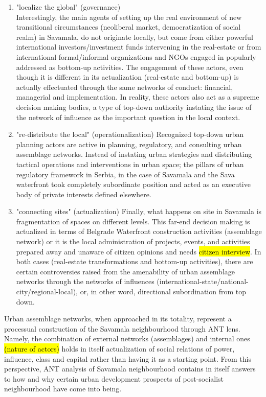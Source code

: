 \documentclass[11pt]{report}
\begin{document}
\begin{enumerate}
\item "localize the global" (governance)
\\
Interestingly, the main agents of setting up the real environment of new transitional circumstances (neoliberal market, democratization of social realm) in Savamala, do not originate locally, but come from either powerful international investors/investment funds intervening in the real-estate or from international formal/informal organizations and NGOs engaged in popularly addressed as bottom-up activities.
The engagement of these actors, even though it is different in its actualization (real-estate and bottom-up) is actually effectuated through the same networks of conduct: financial, managerial and implementation.
In reality, these actors also act as a supreme decision making bodies, a type of top-down authority instating the issue of the network of influence as the important question in  the local context. 
\item "re-distribute the local" (operationalization)
Recognized top-down urban planning actors are active in planning, regulatory, and consulting urban assemblage networks. Instead of instating urban strategies and distributing tactical operations and interventions in urban space; the pillars of urban regulatory framework in Serbia, in the case of Savamala and the Sava waterfront took completely subordinate position and acted as an executive body of private interests defined elsewhere.
\item "connecting sites" (actualization)
Finally, what happens on site in Savamala is fragmentation of spaces on different levels.
This far-end decision making is actualized in terms of Belgrade Waterfront construction activities (assemblage network) or it is the local administration of projects, events, and activities prepared away and unaware of citizen opinions and needs \hl{citizen interview}.
In both cases (real-estate transformations and bottom-up activities), there are certain controversies raised from the amenability of urban assemblage networks through the networks of influences (international-state/national-city/regional-local), or, in other word, directional subordination from top down.
\end{enumerate}

Urban assemblage networks, when approached in its totality, represent a processual construction of the Savamala neighbourhood through ANT lens. Namely, the combination of external networks (assemblages) and internal ones \hl{(nature of actors)} holds in itself actualization of social relations of power, influence, class and capital rather than having it as a starting point.
From this perspective, ANT analysis of Savamala neighbourhood contains in itself answers to how and why certain urban development prospects of post-socialist neighbourhood have come into being.
\end{document}
